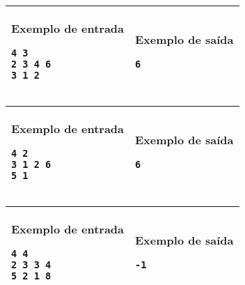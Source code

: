 \newpage
\begin{table}[!h]
\centering
\begin{tabular}{|l|l|}
\hline
\begin{minipage}[t]{3in}
\textbf{Exemplo de entrada}
\begin{verbatim}
4 3
2 3 4 6
3 1 2 
\end{verbatim}
\vspace{1mm}
\end{minipage}
&
\begin{minipage}[t]{3in}
\textbf{Exemplo de saída}
\begin{verbatim}
6
\end{verbatim}
\vspace{1mm}
\end{minipage} \\
\hline
\end{tabular}
\end{table}

\begin{table}[!h]
\centering
\begin{tabular}{|l|l|}
\hline
\begin{minipage}[t]{3in}
\textbf{Exemplo de entrada}
\begin{verbatim}
4 2
3 1 2 6
5 1
\end{verbatim}
\vspace{1mm}
\end{minipage}
&
\begin{minipage}[t]{3in}
\textbf{Exemplo de saída}
\begin{verbatim}
6
\end{verbatim}
\vspace{1mm}
\end{minipage} \\
\hline
\end{tabular}
\end{table}

\begin{table}[!h]
\centering
\begin{tabular}{|l|l|}
\hline
\begin{minipage}[t]{3in}
\textbf{Exemplo de entrada}
\begin{verbatim}
4 4
2 3 3 4
5 2 1 8
\end{verbatim}
\vspace{1mm}
\end{minipage}
&
\begin{minipage}[t]{3in}
\textbf{Exemplo de saída}
\begin{verbatim}
-1
\end{verbatim}
\vspace{1mm}
\end{minipage} \\
\hline
\end{tabular}
\end{table}
